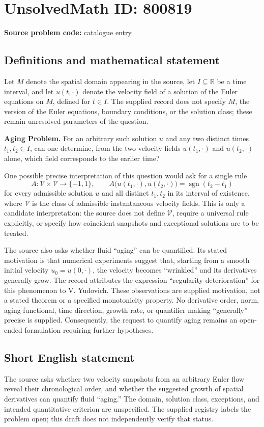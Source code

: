 \documentclass[11pt]{article}
\newcommand{\R}{\mathbb{R}}
\begin{document}
\section*{UnsolvedMath ID: 800819}
\textbf{Source problem code:} catalogue entry
\subsection{Definitions and mathematical statement}
Let \(M\) denote the spatial domain appearing in the source, let \(I\subseteq\R\) be a time interval, and let \(u(t,\cdot)\) denote the velocity field of a solution of the Euler equations on \(M\), defined for \(t\in I\). The supplied record does not specify \(M\), the version of the Euler equations, boundary conditions, or the solution class; these remain unresolved parameters of the question.

\textbf{Aging Problem.} For an arbitrary such solution \(u\) and any two distinct times \(t_1,t_2\in I\), can one determine, from the two velocity fields \(u(t_1,\cdot)\) and \(u(t_2,\cdot)\) alone, which field corresponds to the earlier time?

One possible precise interpretation of this question would ask for a single rule
\[
A:\mathcal V\times\mathcal V\longrightarrow\{-1,1\},
\qquad
A\bigl(u(t_1,\cdot),u(t_2,\cdot)\bigr)
=\operatorname{sgn}(t_2-t_1)
\]
for every admissible solution \(u\) and all distinct \(t_1,t_2\) in its interval of existence, where \(\mathcal V\) is the class of admissible instantaneous velocity fields. This is only a candidate interpretation: the source does not define \(\mathcal V\), require a universal rule explicitly, or specify how coincident snapshots and exceptional solutions are to be treated.

The source also asks whether fluid ``aging'' can be quantified. Its stated motivation is that numerical experiments suggest that, starting from a smooth initial velocity \(u_0=u(0,\cdot)\), the velocity becomes ``wrinkled'' and its derivatives generally grow. The record attributes the expression ``regularity deterioration'' for this phenomenon to V. Yudovich. These observations are supplied motivation, not a stated theorem or a specified monotonicity property. No derivative order, norm, aging functional, time direction, growth rate, or quantifier making ``generally'' precise is supplied. Consequently, the request to quantify aging remains an open-ended formulation requiring further hypotheses.
\subsection{Short English statement}
The source asks whether two velocity snapshots from an arbitrary Euler flow reveal their chronological order, and whether the suggested growth of spatial derivatives can quantify fluid ``aging.'' The domain, solution class, exceptions, and intended quantitative criterion are unspecified. The supplied registry labels the problem open; this draft does not independently verify that status.
\end{document}
